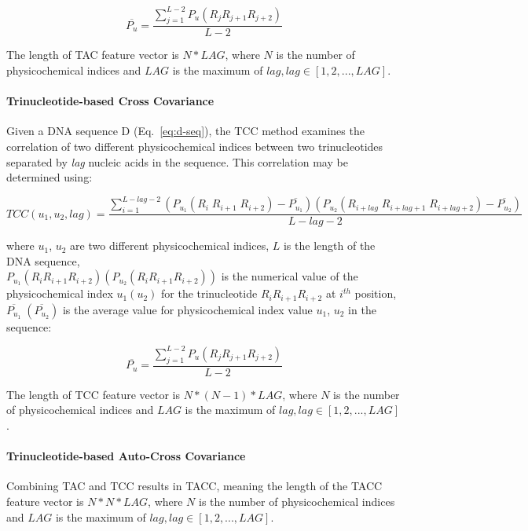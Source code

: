 \begin{equation}\label{eq:tac-2}
    \overline{P_{u}} = \frac{\sum_{j=1}^{L-2}P_{u}(R_{j}R_{j+1}R_{j+2})}{L-2}
\end{equation}

The length of \gls{TAC} feature vector is $N*LAG$, where $N$ is the number of physicochemical indices and $LAG$ is the maximum of $lag, lag \in [1,2,...,LAG]$.

\paragraph{Trinucleotide-based Cross Covariance}

Given a \gls{DNA} sequence D (Eq.~\ref{eq:d-seq}), the \gls{TCC} method examines the correlation of two different physicochemical indices between two trinucleotides separated by \textit{lag} nucleic acids in the sequence. This correlation may be determined using:

\begin{equation}\label{eq:TCC}
    TCC(u_{1},u_{2},lag) = \frac{\sum_{i=1}^{L-lag-2}(P_{u_{1}}(R_{i}\;R_{i+1}\;R_{i+2}) - \overline{P_{u_{1}}})(P_{u_{2}}(R_{i+lag}\;R_{i+lag+1}\;R_{i+lag+2}) - \overline{P_{u_{2}}})}{L-lag-2}
\end{equation}

\noindent where $u_{1}$, $u_{2}$ are two different physicochemical indices, $L$ is the length of the \gls{DNA} sequence, \\ $P_{u_{1}}(R_{i}R_{i+1}R_{i+2}) (P_{u_{2}}(R_{i}R_{i+1}R_{i+2}))$ is the numerical value of the physicochemical index $u_{1}(u_{2})$ for the trinucleotide $R_{i}R_{i+1}R_{i+2}$ at $i^{th}$ position, $\overline{P_{u_{1}}}\;(\overline{P_{u_{2}}})$ is the average value for physicochemical index value $u_{1}$, $u_{2}$ in the sequence:

\begin{equation}\label{eq:TCC-PU2}
    \overline{P_{u}} = \frac{\sum_{j=1}^{L-2}P_{u}(R_{j}R_{j+1}R_{j+2})}{L-2}
\end{equation}

The length of \gls{TCC} feature vector is $N*(N-1)*LAG$, where $N$ is the number of physicochemical indices and $LAG$ is the maximum of $lag, lag \in [1,2,...,LAG]$.


\paragraph{Trinucleotide-based Auto-Cross Covariance}
Combining \gls{TAC} and \gls{TCC} results in \gls{TACC}, meaning the length of the \gls{TACC} feature vector is $N*N*LAG$, where $N$ is the number of physicochemical indices and $LAG$ is the maximum of $lag, lag \in [1,2,...,LAG]$.


